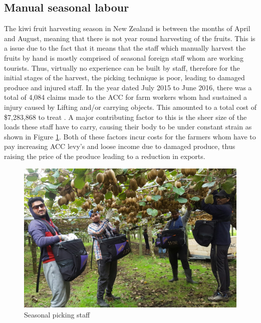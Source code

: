 \documentclass[11pt]{article}
\begin{document}
\subsection{Manual seasonal labour}
The kiwi fruit harvesting season in New Zealand is between the months of April and August, meaning that there is not year round harvesting of the fruits. This is a issue due to the fact that it means that the staff which manually harvest the fruits by hand is mostly comprised of seasonal foreign staff whom are working tourists. Thus, virtually no experience can be built by staff, therefore for the initial stages of the harvest, the picking technique is poor, leading to damaged produce and injured staff. In the year dated July 2015 to June 2016, there was a total of 4,084 claims made to the ACC for farm workers whom had sustained a injury caused by Lifting and/or carrying objects. This amounted to a total cost of \$7,283,868 to treat \cite{injury_statistics_tool_2017}. A major contributing factor to this is the sheer size of the loads these staff have to carry, causing their body to be under constant strain as shown in Figure \ref{fig:Picking}.  Both of these factors incur costs for the farmers whom have to pay increasing ACC levy's and loose income due to damaged produce, thus raising the price of the produce leading to a reduction in exports.
\begin{figure}[h]
\centering
\includegraphics[scale=0.2]{Pickers}
\caption{Seasonal picking staff}
\label{fig:Picking}
\end{figure}
\end{document}
